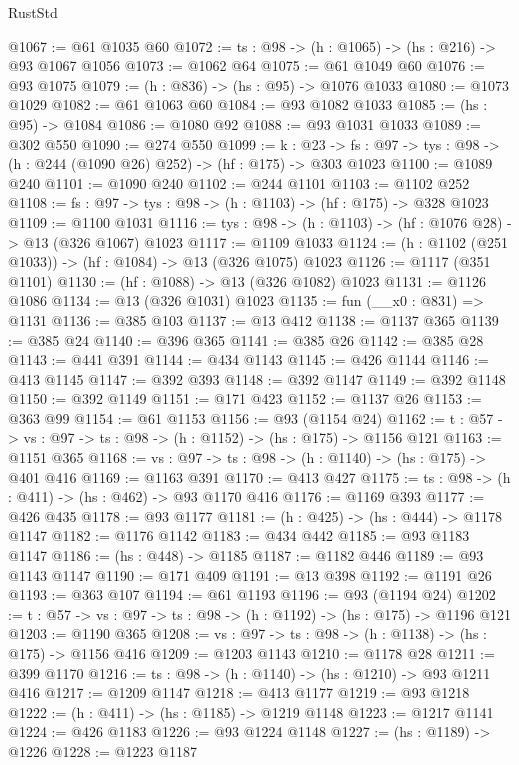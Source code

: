 \begin{lexlean}{RustStd}
\begin{coremodule}
@1067 := @61 @1035 @60
@1072 := {ts : @98} -> (h : @1065) -> (hs : @216) -> @93 @1067 @1056
@1073 := @1062 @64
@1075 := @61 @1049 @60
@1076 := @93 @1075
@1079 := (h : @836) -> (hs : @95) -> @1076 @1033
@1080 := @1073 @1029
@1082 := @61 @1063 @60
@1084 := @93 @1082 @1033
@1085 := (hs : @95) -> @1084
@1086 := @1080 @92
@1088 := @93 @1031 @1033
@1089 := @302 @550
@1090 := @274 @550
@1099 := {k : @23} ->
  {fs : @97} -> {tys : @98} -> (h : @244 (@1090 @26) @252) -> (hf : @175) -> @303 @1023
@1100 := @1089 @240
@1101 := @1090 @240
@1102 := @244 @1101
@1103 := @1102 @252
@1108 := {fs : @97} -> {tys : @98} -> (h : @1103) -> (hf : @175) -> @328 @1023
@1109 := @1100 @1031
@1116 := {tys : @98} -> (h : @1103) -> (hf : @1076 @28) -> @13 (@326 @1067) @1023
@1117 := @1109 @1033
@1124 := (h : @1102 (@251 @1033)) -> (hf : @1084) -> @13 (@326 @1075) @1023
@1126 := @1117 (@351 @1101)
@1130 := (hf : @1088) -> @13 (@326 @1082) @1023
@1131 := @1126 @1086
@1134 := @13 (@326 @1031) @1023
@1135 := fun (__x0 : @831) => @1131
@1136 := @385 @103
@1137 := @13 @412
@1138 := @1137 @365
@1139 := @385 @24
@1140 := @396 @365
@1141 := @385 @26
@1142 := @385 @28
@1143 := @441 @391
@1144 := @434 @1143
@1145 := @426 @1144
@1146 := @413 @1145
@1147 := @392 @393
@1148 := @392 @1147
@1149 := @392 @1148
@1150 := @392 @1149
@1151 := @171 @423
@1152 := @1137 @26
@1153 := @363 @99
@1154 := @61 @1153
@1156 := @93 (@1154 @24)
@1162 := {t : @57} -> {vs : @97} -> {ts : @98} -> (h : @1152) -> (hs : @175) -> @1156 @121
@1163 := @1151 @365
@1168 := {vs : @97} -> {ts : @98} -> (h : @1140) -> (hs : @175) -> @401 @416
@1169 := @1163 @391
@1170 := @413 @427
@1175 := {ts : @98} -> (h : @411) -> (hs : @462) -> @93 @1170 @416
@1176 := @1169 @393
@1177 := @426 @435
@1178 := @93 @1177
@1181 := (h : @425) -> (hs : @444) -> @1178 @1147
@1182 := @1176 @1142
@1183 := @434 @442
@1185 := @93 @1183 @1147
@1186 := (hs : @448) -> @1185
@1187 := @1182 @446
@1189 := @93 @1143 @1147
@1190 := @171 @409
@1191 := @13 @398
@1192 := @1191 @26
@1193 := @363 @107
@1194 := @61 @1193
@1196 := @93 (@1194 @24)
@1202 := {t : @57} -> {vs : @97} -> {ts : @98} -> (h : @1192) -> (hs : @175) -> @1196 @121
@1203 := @1190 @365
@1208 := {vs : @97} -> {ts : @98} -> (h : @1138) -> (hs : @175) -> @1156 @416
@1209 := @1203 @1143
@1210 := @1178 @28
@1211 := @399 @1170
@1216 := {ts : @98} -> (h : @1140) -> (hs : @1210) -> @93 @1211 @416
@1217 := @1209 @1147
@1218 := @413 @1177
@1219 := @93 @1218
@1222 := (h : @411) -> (hs : @1185) -> @1219 @1148
@1223 := @1217 @1141
@1224 := @426 @1183
@1226 := @93 @1224 @1148
@1227 := (hs : @1189) -> @1226
@1228 := @1223 @1187

\end{coremodule}
\end{lexlean}
